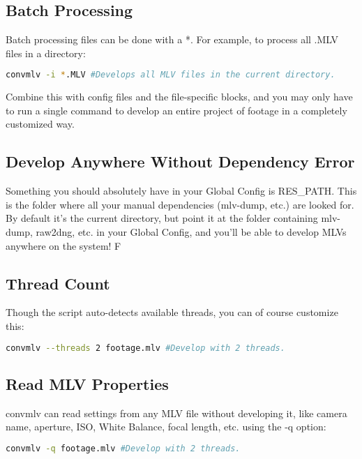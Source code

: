 \documentclass[a4paper,12pt]{article}
\begin{document}
	\subsection{Batch Processing}

		Batch processing files can be done with a *. For example, to process all .MLV files in a directory:
	
\begin{lstlisting}[language=bash]
	convmlv -i *.MLV #Develops all MLV files in the current directory.
\end{lstlisting}

		Combine this with config files and the file-specific blocks, and you may only have to run a single
		command to develop an entire project of footage in a completely customized way.
		
	\subsection{Develop Anywhere Without Dependency Error}

	Something you should absolutely have in your Global Config is RES\_PATH. This is the folder where all your manual dependencies (mlv-dump, etc.) are looked for.
	By default it's the current directory, but point it at the folder containing mlv-dump, raw2dng, etc. in your Global Config, and you'll
	be able to develop MLVs anywhere on the system!
	F
	\subsection{Thread Count}
	
		Though the script auto-detects available threads, you can of course customize this:
	
\begin{lstlisting}[language=bash]
	convmlv --threads 2 footage.mlv #Develop with 2 threads.
\end{lstlisting}

	\subsection{Read MLV Properties}
		convmlv can read settings from any MLV file without developing it, like camera name, aperture, ISO, White Balance, focal length, etc. 
		using the -q option:
		
\begin{lstlisting}[language=bash]
	convmlv -q footage.mlv #Develop with 2 threads.
\end{lstlisting}
\end{document}
